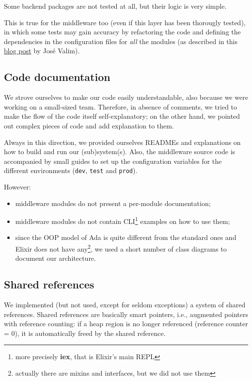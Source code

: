 Some backend packages are not tested at all, but their logic is very simple.

This is true for the middleware too (even if this layer has been thorougly
tested), in which some tests may gain accuracy by refactoring the code and
defining the dependencies in the configuration files for \textit{all} the
modules (as described in this
\href{http://blog.plataformatec.com.br/2015/10/mocks-and-explicit-contracts/}{blog post} by Jos\'e Valim).

\subsection{Code documentation}
We strove ourselves to make our code easily understandable, also because we
were working on a small-sized team.
Therefore, in absence of comments, we tried to make the flow of the code itself
self-explanatory; on the other hand, we pointed out complex pieces of code and
add explanation to them.

Always in this direction, we provided ourselves READMEs and explanations on how
to build and run our (sub)system(s). Also, the middleware source code is
accompanied by small guides to set up the configuration variables for the
different environments (\texttt{dev}, \texttt{test} and \texttt{prod}).

However:
\begin{itemize}
  \item middleware modules do not present a per-module documentation;
  \item middleware modules do not contain CLI\footnote{more precisely
    \textbf{iex}, that is Elixir's main REPL} examples on how to use them;
  \item since the OOP model of Ada is quite different from the standard ones
    and Elixir does not have any\footnote{actually there are mixins and
    interfaces, but we did not use them}, we used a short number of class
    diagrams to document our architecture.
\end{itemize}

\subsection{Shared references}
We implemented (but not used, except for seldom exceptions) a system of shared
references.
Shared references are basically smart pointers, i.e., augmented pointers with
reference counting: if a heap region is no longer referenced (reference counter = 0),
it is automatically freed by the shared reference.

